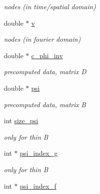 \begin{CompactItemize}
\begin{CompactList}\small\item\em nodes (in time/spatial domain) \item\end{CompactList}\item 
\hypertarget{structnnfft__plan_o18}{
double $\ast$ \hyperlink{structnnfft__plan_o18}{v}}
\label{structnnfft__plan_o18}

\begin{CompactList}\small\item\em nodes (in fourier domain) \item\end{CompactList}\item 
\hypertarget{structnnfft__plan_o19}{
double $\ast$ \hyperlink{structnnfft__plan_o19}{c\_\-phi\_\-inv}}
\label{structnnfft__plan_o19}

\begin{CompactList}\small\item\em precomputed data, matrix D \item\end{CompactList}\item 
\hypertarget{structnnfft__plan_o20}{
double $\ast$ \hyperlink{structnnfft__plan_o20}{psi}}
\label{structnnfft__plan_o20}

\begin{CompactList}\small\item\em precomputed data, matrix B \item\end{CompactList}\item 
\hypertarget{structnnfft__plan_o21}{
int \hyperlink{structnnfft__plan_o21}{size\_\-psi}}
\label{structnnfft__plan_o21}

\begin{CompactList}\small\item\em only for thin B \item\end{CompactList}\item 
\hypertarget{structnnfft__plan_o22}{
int $\ast$ \hyperlink{structnnfft__plan_o22}{psi\_\-index\_\-g}}
\label{structnnfft__plan_o22}

\begin{CompactList}\small\item\em only for thin B \item\end{CompactList}\item 
\hypertarget{structnnfft__plan_o23}{
int $\ast$ \hyperlink{structnnfft__plan_o23}{psi\_\-index\_\-f}}
\label{structnnfft__plan_o23}


\end{CompactItemize}
